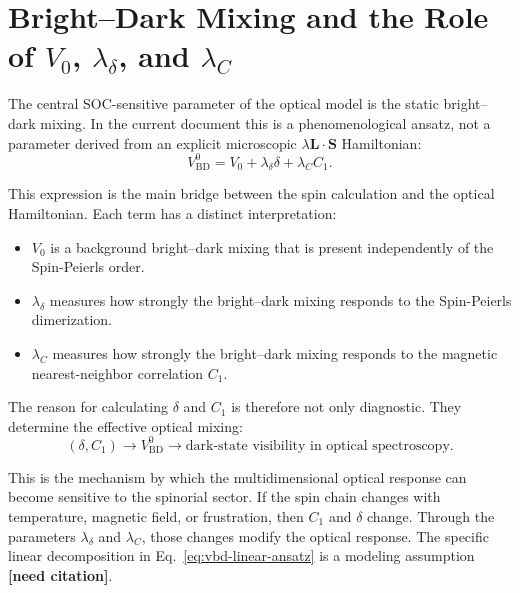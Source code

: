 \documentclass[11pt]{article}
\newcommand{\needcite}{\textbf{[need citation]}}
\begin{document}
\section{Bright--Dark Mixing and the Role of \texorpdfstring{\(V_0\), \(\lambda_\delta\), and \(\lambda_C\)}{V0, lambda-delta, and lambda-C}}

The central SOC-sensitive parameter of the optical model is the static bright--dark mixing. In the current document this is a phenomenological ansatz, not a parameter derived from an explicit microscopic \(\lambda\bm{L}\cdot\bm{S}\) Hamiltonian:
\begin{equation}
\label{eq:vbd-linear-ansatz}
V_{\mathrm{BD}}^0
=
V_0+\lambda_\delta\delta+\lambda_C C_1.
\end{equation}

This expression is the main bridge between the spin calculation and the optical Hamiltonian. Each term has a distinct interpretation:
\begin{itemize}
    \item \(V_0\) is a background bright--dark mixing that is present independently of the Spin-Peierls order.
    \item \(\lambda_\delta\) measures how strongly the bright--dark mixing responds to the Spin-Peierls dimerization.
    \item \(\lambda_C\) measures how strongly the bright--dark mixing responds to the magnetic nearest-neighbor correlation \(C_1\).
\end{itemize}

The reason for calculating \(\delta\) and \(C_1\) is therefore not only diagnostic. They determine the effective optical mixing:
\begin{equation}
(\delta,C_1)
\longrightarrow
V_{\mathrm{BD}}^0
\longrightarrow
\text{dark-state visibility in optical spectroscopy}.
\end{equation}

This is the mechanism by which the multidimensional optical response can become sensitive to the spinorial sector. If the spin chain changes with temperature, magnetic field, or frustration, then \(C_1\) and \(\delta\) change. Through the parameters \(\lambda_\delta\) and \(\lambda_C\), those changes modify the optical response. The specific linear decomposition in Eq.~\eqref{eq:vbd-linear-ansatz} is a modeling assumption \needcite.
\end{document}
